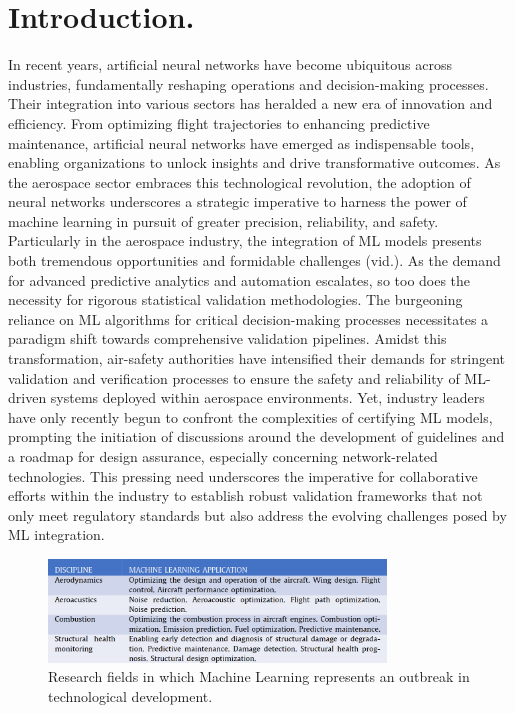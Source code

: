 \chapter{Introduction.}
%
\indent In recent years, artificial neural networks have become ubiquitous across industries, fundamentally reshaping operations and decision-making processes. Their integration into various sectors has heralded a new era of innovation and efficiency. From optimizing flight trajectories\cite{xu2023machine} to enhancing predictive maintenance\cite{shukla2020opportunities,adhikari2018machine,korvesis2017machine}, artificial neural networks have emerged as indispensable tools, enabling organizations to unlock insights and drive transformative outcomes. As the aerospace sector embraces this technological revolution, the adoption of neural networks underscores a strategic imperative to harness the power of machine learning in pursuit of greater precision, reliability, and safety. Particularly in the aerospace industry, the integration of ML models presents both tremendous opportunities and formidable challenges (vid.). As the demand for advanced predictive analytics and automation escalates, so too does the necessity for rigorous statistical validation methodologies. The burgeoning reliance on ML algorithms for critical decision-making processes necessitates a paradigm shift towards comprehensive validation pipelines. Amidst this transformation, air-safety authorities have intensified their demands for stringent validation and verification processes\cite{force2021concepts,roadmap2021easa} to ensure the safety and reliability of ML-driven systems deployed within aerospace environments. Yet, industry leaders have only recently begun to confront the complexities of certifying ML models\cite{henderson2022toward,durand2023formal,dmitriev2021toward,el2022certification,paul2023assurance}, prompting the initiation of discussions around the development of guidelines and a roadmap for design assurance, especially concerning network-related technologies. This pressing need underscores the imperative for collaborative efforts within the industry to establish robust validation frameworks that not only meet regulatory standards but also address the evolving challenges posed by ML integration.\\
\begin{figure}[!htb]
	\centering
	\includegraphics[width=0.8\textwidth]{Figures/ml_applications.png}
	\caption{Research fields in which Machine Learning represents an outbreak in technological development. \cite{le2023improving}}
\end{figure}
